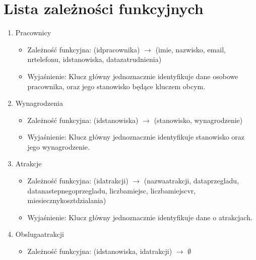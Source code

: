 \documentclass{article}
\begin{document}
\section{\LARGE Lista zależności funkcyjnych}
\begin{enumerate}
\item Pracownicy 
\begin{itemize}
    \item Zależność funkcyjna: \newline
    (id\textunderscore pracownika) $\rightarrow$ (imie, nazwisko, email, nr\textunderscore telefonu, id\textunderscore stanowiska, data\textunderscore zatrudnienia)
    \item Wyjaśnienie: \newline
    Klucz główny jednoznacznie identyfikuje dane osobowe pracownika, oraz jego stanowisko będące kluczem obcym.
\end{itemize}
\item Wynagrodzenia
\begin{itemize}
    \item Zależność funkcyjna: \newline
    (id\textunderscore stanowiska) $\rightarrow$ (stanowisko, wynagrodzenie)
    \item Wyjaśnienie: \newline
    Klucz główny jednoznacznie identyfikuje stanowisko oraz jego wynagrodzenie.
\end{itemize}
\item Atrakcje 
\begin{itemize}
    \item Zależność funkcyjna: \newline
    (id\textunderscore atrakcji) $\rightarrow$ (nazwa\textunderscore atrakcji, data\textunderscore przegladu, data\textunderscore nastepnego\textunderscore przegladu, liczba\textunderscore miejsc, liczba\textunderscore miejsc\textunderscore vr, miesieczny\textunderscore koszt\textunderscore dzialania)
    \item Wyjaśnienie: \newline
    Klucz główny jednoznacznie identyfikuje dane o atrakcjach.
\end{itemize}
\item Obsluga\textunderscore atrakcji 
\begin{itemize}
    \item Zależność funkcyjna: \newline
    (id\textunderscore stanowiska, id\textunderscore atrakcji) $\rightarrow$ $\emptyset$

\end{itemize}
\end{enumerate}
\end{document}
